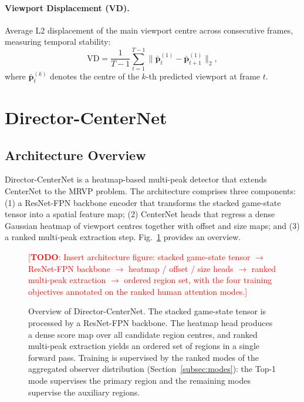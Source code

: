 \documentclass[preprint,12pt]{elsarticle}
\newcommand{\todo}[1]{\textcolor{red}{[\textbf{TODO}: #1]}}
\begin{document}
\paragraph{Viewport Displacement (VD).}
Average L2 displacement of the main viewport centre across consecutive
frames, measuring temporal stability:
\begin{equation}
  \text{VD} = \frac{1}{T-1}\sum_{t=1}^{T-1}
    \bigl\|\bar{\mathbf{p}}^{(1)}_t - \bar{\mathbf{p}}^{(1)}_{t+1}\bigr\|_2,
  \label{eq:vd}
\end{equation}
where $\bar{\mathbf{p}}^{(k)}_t$ denotes the centre of the $k$-th predicted 
viewport at frame $t$.

\section{Director-CenterNet}
\label{sec:method}

\subsection{Architecture Overview}

Director-CenterNet is a heatmap-based multi-peak detector that extends 
CenterNet \cite{zhou2019objects} to the MRVP problem. The architecture 
comprises three components: (1) a ResNet-FPN backbone encoder that transforms 
the stacked game-state tensor into a spatial feature map; (2) CenterNet heads 
that regress a dense Gaussian heatmap of viewport centres together with offset 
and size maps; and (3) a ranked multi-peak extraction step. 
Fig.~\ref{fig:architecture} provides an overview.

\begin{figure}[t]
  \centering
  \todo{Insert architecture figure: stacked game-state tensor $\rightarrow$
  ResNet-FPN backbone $\rightarrow$ heatmap / offset / size heads
  $\rightarrow$ ranked multi-peak extraction $\rightarrow$ ordered region set,
  with the four training objectives annotated on the ranked human attention
  modes.}
  \caption{Overview of Director-CenterNet. The stacked game-state tensor is
  processed by a ResNet-FPN backbone. The heatmap head produces a dense score
  map over all candidate region centres, and ranked multi-peak extraction
  yields an ordered set of regions in a single forward pass. Training is
  supervised by the ranked modes of the aggregated observer distribution
  (Section~\ref{subsec:modes}): the Top-1 mode supervises the primary region
  and the remaining modes supervise the auxiliary regions.}
  \label{fig:architecture}
\end{figure}
\end{document}
